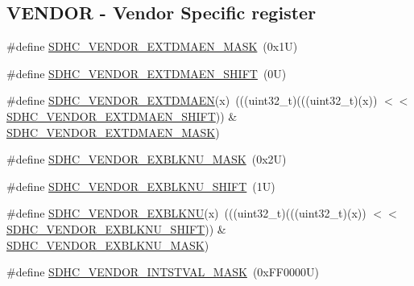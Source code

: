 \subsection*{V\+E\+N\+D\+OR -\/ Vendor Specific register}
\begin{DoxyCompactItemize}
\item 
\#define \mbox{\hyperlink{group___s_d_h_c___register___masks_ga83921c53d734582d4faefacf105dab13}{S\+D\+H\+C\+\_\+\+V\+E\+N\+D\+O\+R\+\_\+\+E\+X\+T\+D\+M\+A\+E\+N\+\_\+\+M\+A\+SK}}~(0x1\+U)
\item 
\#define \mbox{\hyperlink{group___s_d_h_c___register___masks_ga983ed2560d2e6ab70865f447d0519d07}{S\+D\+H\+C\+\_\+\+V\+E\+N\+D\+O\+R\+\_\+\+E\+X\+T\+D\+M\+A\+E\+N\+\_\+\+S\+H\+I\+FT}}~(0\+U)
\item 
\#define \mbox{\hyperlink{group___s_d_h_c___register___masks_ga35dfe301ced941a01fe8399d54b2db5a}{S\+D\+H\+C\+\_\+\+V\+E\+N\+D\+O\+R\+\_\+\+E\+X\+T\+D\+M\+A\+EN}}(x)~(((uint32\+\_\+t)(((uint32\+\_\+t)(x)) $<$$<$ \mbox{\hyperlink{group___s_d_h_c___register___masks_ga983ed2560d2e6ab70865f447d0519d07}{S\+D\+H\+C\+\_\+\+V\+E\+N\+D\+O\+R\+\_\+\+E\+X\+T\+D\+M\+A\+E\+N\+\_\+\+S\+H\+I\+FT}})) \& \mbox{\hyperlink{group___s_d_h_c___register___masks_ga83921c53d734582d4faefacf105dab13}{S\+D\+H\+C\+\_\+\+V\+E\+N\+D\+O\+R\+\_\+\+E\+X\+T\+D\+M\+A\+E\+N\+\_\+\+M\+A\+SK}})
\item 
\#define \mbox{\hyperlink{group___s_d_h_c___register___masks_gaa0a0cbb02b6172ad044e259017665d02}{S\+D\+H\+C\+\_\+\+V\+E\+N\+D\+O\+R\+\_\+\+E\+X\+B\+L\+K\+N\+U\+\_\+\+M\+A\+SK}}~(0x2\+U)
\item 
\#define \mbox{\hyperlink{group___s_d_h_c___register___masks_gafc7b41b0f492ed43f488063697000cf3}{S\+D\+H\+C\+\_\+\+V\+E\+N\+D\+O\+R\+\_\+\+E\+X\+B\+L\+K\+N\+U\+\_\+\+S\+H\+I\+FT}}~(1\+U)
\item 
\#define \mbox{\hyperlink{group___s_d_h_c___register___masks_ga52dd28767fe4b33b354bad09961ccb43}{S\+D\+H\+C\+\_\+\+V\+E\+N\+D\+O\+R\+\_\+\+E\+X\+B\+L\+K\+NU}}(x)~(((uint32\+\_\+t)(((uint32\+\_\+t)(x)) $<$$<$ \mbox{\hyperlink{group___s_d_h_c___register___masks_gafc7b41b0f492ed43f488063697000cf3}{S\+D\+H\+C\+\_\+\+V\+E\+N\+D\+O\+R\+\_\+\+E\+X\+B\+L\+K\+N\+U\+\_\+\+S\+H\+I\+FT}})) \& \mbox{\hyperlink{group___s_d_h_c___register___masks_gaa0a0cbb02b6172ad044e259017665d02}{S\+D\+H\+C\+\_\+\+V\+E\+N\+D\+O\+R\+\_\+\+E\+X\+B\+L\+K\+N\+U\+\_\+\+M\+A\+SK}})
\item 
\#define \mbox{\hyperlink{group___s_d_h_c___register___masks_ga59d8694a1bf1d55be388439ed4419ab3}{S\+D\+H\+C\+\_\+\+V\+E\+N\+D\+O\+R\+\_\+\+I\+N\+T\+S\+T\+V\+A\+L\+\_\+\+M\+A\+SK}}~(0x\+F\+F0000\+U)

\end{DoxyCompactItemize}

